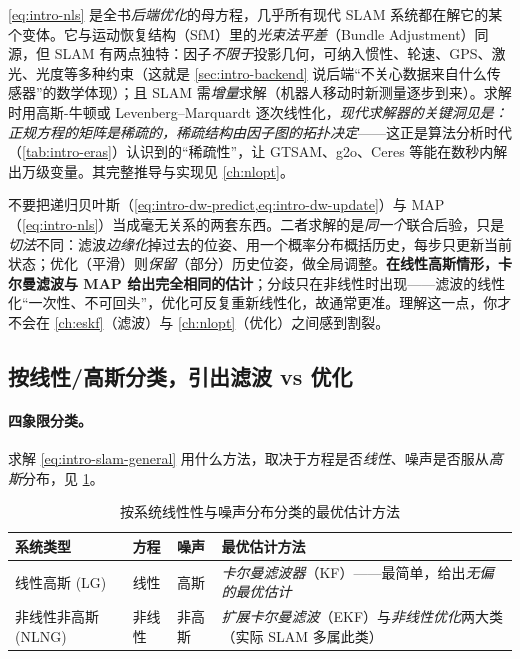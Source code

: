 \begin{insight}
\cref{eq:intro-nls} 是全书\emph{后端优化}的母方程，几乎所有现代 SLAM 系统都在解它的某个变体\cite{cadena2016past}。它与运动恢复结构（SfM）里的\emph{光束法平差}（Bundle Adjustment）同源，但 SLAM 有两点独特：因子\emph{不限于}投影几何，可纳入惯性、轮速、GPS、激光、光度等多种约束（这就是 \cref{sec:intro-backend} 说后端“不关心数据来自什么传感器”的数学体现）；且 SLAM 需\emph{增量}求解（机器人移动时新测量逐步到来）。求解时用高斯-牛顿或 Levenberg--Marquardt 逐次线性化，\emph{现代求解器的关键洞见是：正规方程的矩阵是稀疏的，稀疏结构由因子图的拓扑决定}——这正是算法分析时代（\cref{tab:intro-eras}）认识到的“稀疏性”，让 GTSAM、g2o、Ceres 等能在数秒内解出万级变量。其完整推导与实现见 \cref{ch:nlopt}。
\end{insight}

\begin{pitfall}
不要把递归贝叶斯（\cref{eq:intro-dw-predict,eq:intro-dw-update}）与 MAP（\cref{eq:intro-nls}）当成毫无关系的两套东西。二者求解的是\emph{同一个}联合后验，只是\emph{切法}不同：滤波\emph{边缘化}掉过去的位姿、用一个概率分布概括历史，每步只更新当前状态；优化（平滑）则\emph{保留}（部分）历史位姿，做全局调整。\textbf{在线性高斯情形，卡尔曼滤波与 MAP 给出完全相同的估计}\cite{cadena2016past}；分歧只在非线性时出现——滤波的线性化“一次性、不可回头”，优化可反复重新线性化，故通常更准。理解这一点，你才不会在 \cref{ch:eskf}（滤波）与 \cref{ch:nlopt}（优化）之间感到割裂。
\end{pitfall}

\subsection{按线性/高斯分类，引出滤波 vs 优化}
\label{sec:intro-est}
\paragraph{四象限分类。}
求解 \cref{eq:intro-slam-general} 用什么方法，取决于方程是否\emph{线性}、噪声是否服从\emph{高斯}分布\cite{gaoxiang2019slam14}，见 \cref{tab:intro-lgnlng}。

\begin{table}[H]\centering\small
\caption{按系统线性性与噪声分布分类的最优估计方法}
\label{tab:intro-lgnlng}
\begin{tabular}{p{} p{} p{} p{}}
\toprule
系统类型 & 方程 & 噪声 & 最优估计方法 \\
\midrule
线性高斯 (LG) & 线性 & 高斯 & \emph{卡尔曼滤波器}（KF）——最简单，给出\emph{无偏的最优估计} \\
非线性非高斯 (NLNG) & 非线性 & 非高斯 & \emph{扩展卡尔曼滤波}（EKF）与\emph{非线性优化}两大类（实际 SLAM 多属此类） \\
\bottomrule
\end{tabular}
\end{table}

